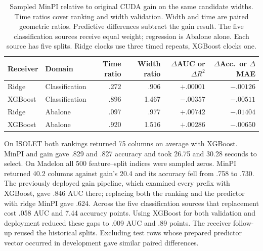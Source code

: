 \begin{table}[h]
\centering\small
\caption{Sampled MinPI relative to original CUDA gain on the same candidate
widths. Time ratios cover ranking and width validation. Width and time are
paired geometric ratios. Predictive differences subtract the gain result.
The five classification sources receive equal weight; regression is Abalone
alone. Each source has five splits. Ridge clocks use three timed repeats,
XGBoost clocks one.}
\label{tab:gain-receiver}
\begin{tabular}{@{}llrrrr@{}}
\toprule
Receiver & Domain & Time ratio & Width ratio & $\Delta$AUC or $\Delta R^2$ & $\Delta$Acc.\ or $\Delta$MAE\\
\midrule
Ridge & Classification & .272 & .906 & $+.00001$ & $-.00126$\\
XGBoost & Classification & .896 & 1.467 & $-.00357$ & $-.00511$\\
Ridge & Abalone & .097 & .977 & $+.00742$ & $-.01404$\\
XGBoost & Abalone & .920 & 1.516 & $+.00286$ & $-.00650$\\
\bottomrule
\end{tabular}
\end{table}

On ISOLET both rankings returned 75 columns on average with XGBoost.
MinPI and gain gave .829 and .827 accuracy and took 26.75 and 30.28 seconds
to select. On Madelon all 500 feature--split indices were sampled zeros.
MinPI returned 40.2 columns against gain's 20.4 and its accuracy fell from
.758 to .730. The previously deployed gain pipeline, which examined every
prefix with XGBoost, gave .846 AUC there; replacing both the ranking and
the predictor with ridge MinPI gave .624. Across the five classification
sources that replacement cost .058 AUC and 7.44 accuracy points.
Using XGBoost for both validation and deployment reduced these gaps to
.009 AUC and .89 points. The receiver follow-up reused the historical
splits. Excluding test rows whose prepared predictor vector occurred in
development gave similar paired differences.
